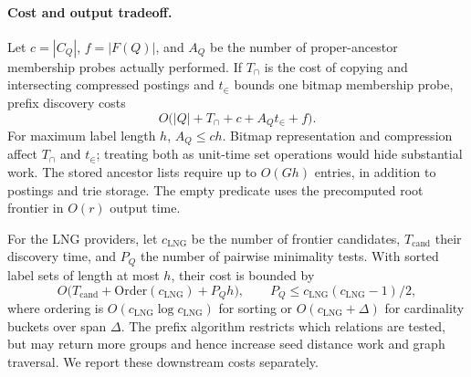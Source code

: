 \paragraph{Cost and output tradeoff.}
Let $c=|C_Q|$, $f=|F(Q)|$, and $A_Q$ be the number of proper-ancestor
membership probes actually performed.  If $T_{\cap}$ is the cost of copying
and intersecting compressed postings and $t_{\in}$ bounds one bitmap
membership probe, prefix discovery costs
\begin{equation}
 O\bigl(|Q|+T_{\cap}+c+A_Qt_{\in}+f\bigr).
\end{equation}
For maximum label length $h$, $A_Q\le ch$.  Bitmap representation and
compression affect $T_{\cap}$ and $t_{\in}$; treating both as unit-time set
operations would hide substantial work.  The stored ancestor lists require
up to $O(Gh)$ entries, in addition to postings and trie storage.  The empty
predicate uses the precomputed root frontier in $O(r)$ output time.

For the LNG providers, let $c_{\mathrm{LNG}}$ be the number of frontier candidates,
$T_{\mathrm{cand}}$ their discovery time, and $P_Q$ the number of pairwise minimality tests.  With sorted label sets of
length at most $h$, their cost is bounded by
\begin{equation}
 O\bigl(T_{\mathrm{cand}}+\mathrm{Order}(c_{\mathrm{LNG}})+P_Qh\bigr),
 \qquad P_Q\le c_{\mathrm{LNG}}(c_{\mathrm{LNG}}-1)/2,
\end{equation}
where ordering is $O(c_{\mathrm{LNG}}\log c_{\mathrm{LNG}})$ for sorting or
$O(c_{\mathrm{LNG}}+\Delta)$ for cardinality
buckets over span $\Delta$.  The
prefix algorithm restricts which relations are tested, but may return more
groups and hence increase seed distance work and graph traversal.  We report
these downstream costs separately.
